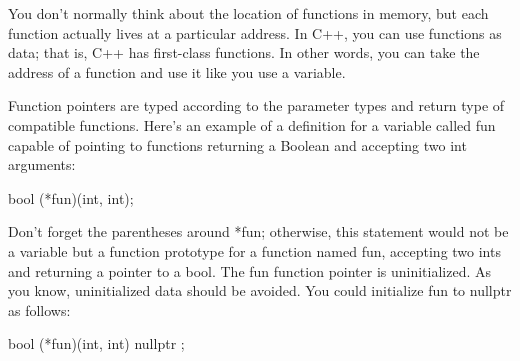 
You don’t normally think about the location of functions in memory, but each function actually lives at a particular address. In C++, you can use functions as data; that is, C++ has first-class functions. In other words, you can take the address of a function and use it like you use a variable.

Function pointers are typed according to the parameter types and return type of compatible functions. Here’s an example of a definition for a variable called fun capable of pointing to functions returning a Boolean and accepting two int arguments:

\begin{cpp}
bool (*fun)(int, int);
\end{cpp}

Don’t forget the parentheses around *fun; otherwise, this statement would not be a variable but a function prototype for a function named fun, accepting two ints and returning a pointer to a bool. The fun function pointer is uninitialized. As you know, uninitialized data should be avoided. You could initialize fun to nullptr as follows:

\begin{cpp}
bool (*fun)(int, int) { nullptr };
\end{cpp}








